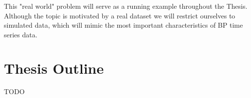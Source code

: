 This "real world" problem will serve as a running example throughout the Thesis.
Although the topic is motivated by a real dataset we will restrict ourselves to simulated data,
which will mimic the most important characteristics of BP time series data.


\section{Thesis Outline}

TODO










